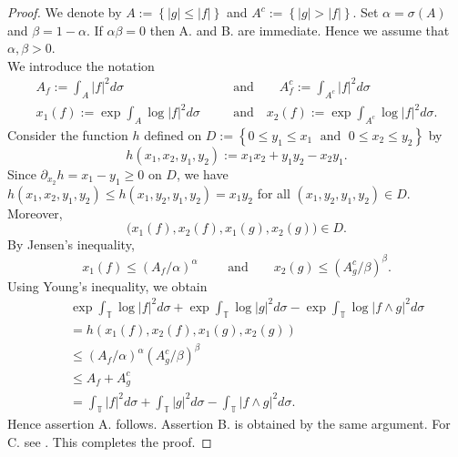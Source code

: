 \documentclass[12pt,reqno,a4paper]{amsart}
\newcommand\TT{\mathbb{T}}
\numberwithin{equation}{section}
\begin{document}
\begin{proof}
	We denote by $A:=\left\lbrace  \vert g \vert \leq \vert f \vert  \right\rbrace$ and $A^c:=\left\lbrace  \vert g \vert > \vert f \vert  \right\rbrace$. Set $\alpha=\sigma(A)$ and $\beta=1-\alpha$. If $\alpha\beta=0$ then A. and B. are immediate. Hence we assume that $\alpha,\beta>0$.\\ 
	We introduce the notation
	\begin{eqnarray*}
		A_f:=\int_A \vert f \vert^2d\sigma \quad &&\mbox{and}\qquad  A_f^c:= \int_{A^c} \vert f \vert^2d\sigma\\
		x_1(f):= \exp\int_{A} \log\vert f \vert^2d\sigma  \quad &&\mbox{and}\quad  x_2(f):= \exp\int_{A^c} \log\vert f \vert^2d\sigma.
	\end{eqnarray*}   
	Consider the function $h$ defined  on $D:=\left\lbrace  0\leq y_1 \leq x_1   \;\mbox{ and }\;  0\leq  x_2\leq y_2\right\rbrace $ by
	$$h(x_1,x_2,y_1,y_2):=x_1x_2+y_1y_2-x_2y_1. $$ 
	Since $\partial_{x_2}h=x_1-y_1\geq 0$ on $D$, we have $h(x_1,x_2,y_1,y_2)
	\leq h(x_1,y_2,y_1,y_2)=x_1y_2$ for all $(x_1,y_2,y_1,y_2)\in D$.
	Moreover,
	\[
	\big(x_1(f), x_2(f), x_1(g), x_2(g)\big) \in D.
	\]
	By Jensen's inequality, 
	$$x_1(f)\leq (A_f/\alpha)^\alpha  \qquad\mbox{ and} \qquad x_2(g) \leq (A_g^c/\beta)^\beta.$$
	Using Young's inequality, we obtain
	\begin{eqnarray}
		&&\exp\int_\TT \log\vert f \vert^2d\sigma+\exp\int_\TT \log\vert g \vert^2d\sigma -\exp\int_\TT \log\vert f \wedge g \vert^2d\sigma  \nonumber\\
		&& = h(x_1(f),x_2(f),x_1(g),x_2(g))  \nonumber\\
		&&\leq  (A_f/\alpha)^\alpha(A_g^c/\beta)^\beta\nonumber\\
		&&\leq A_f+A_g^c \nonumber\\
		&&=\int_\TT \vert f \vert^2d\sigma+\int_\TT \vert g \vert^2d\sigma -\int_\TT \vert f\wedge g \vert^2d\sigma.\nonumber
	\end{eqnarray}
	Hence assertion A. follows. Assertion B. is obtained by the same argument. For C. see \cite[Theorem~3.1]{BE}. This completes the proof.
\end{proof}
\end{document}
